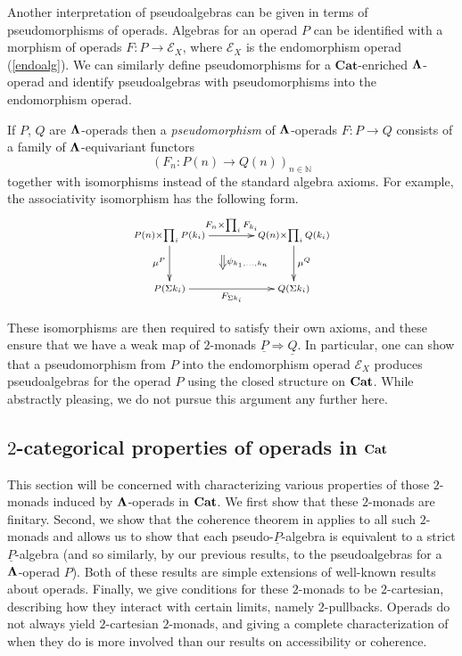\begin{rem}
Another interpretation of pseudoalgebras can be given in terms of pseudomorphisms of operads. Algebras for an operad $P$ can be identified with a morphism of operads $F \colon P \rightarrow \mathcal{E}_X$, where $\mathcal{E}_X$ is the endomorphism operad (\cref{endoalg}). We can similarly define pseudomorphisms for a $\mathbf{Cat}$-enriched $\mathbf{\Lambda}$-operad and identify pseudoalgebras with pseudomorphisms into the endomorphism operad.

If $P$, $Q$ are $\mathbf{\Lambda}$-operads then a \textit{pseudomorphism} of $\mathbf{\Lambda}$-operads $F \colon P \rightarrow Q$ consists of a family of $\mathbf{\Lambda}$-equivariant functors
            \[
                \left(F_n \colon P(n) \rightarrow Q(n)\right)_{n \in \mathbb{N}}
            \]
together with isomorphisms instead of the standard algebra axioms. For example, the associativity isomorphism has the following form.
            \[
                \xy
                    (0,0)*+{\scriptstyle P(n) \times \prod_i P(k_i)}="00";
                    (35,0)*+{\scriptstyle Q(n) \times \prod_i Q(k_i)}="10";
                    (0,-15)*+{\scriptstyle P(\Sigma k_i)}="01";
                    (35,-15)*+{\scriptstyle Q(\Sigma k_i)}="11";
                    {\ar^{F_n \times \prod_i F_{k_i}} "00" ; "10"};
                    {\ar^{\mu^Q} "10" ; "11"};
                    {\ar_{\mu^P} "00" ; "01"};
                    {\ar_{F_{\Sigma k_i}} "01" ; "11"};
                    {\ar@{=>}^{\psi_{k_1,\ldots,k_n}} (15,-5.5) ; (15,-9.5)};
                \endxy
            \]

These isomorphisms are then required to satisfy their own axioms, and these ensure that we have a weak map of $2$-monads $\underline{P} \Rightarrow \underline{Q}$. In particular, one can show that a pseudomorphism from $P$ into the endomorphism operad $\mathcal{E}_X$ produces pseudoalgebras for the operad $P$ using the closed structure on $\mathbf{Cat}$. While abstractly pleasing, we do not pursue this argument any further here.
\end{rem}

\subsection{$2$-categorical properties of operads in \texorpdfstring{$\mathbf{Cat}$}{\textbf{Cat}}}\label{sec:propofopsincat}

This section will be concerned with characterizing various properties of those $2$-monads induced by $\mathbf{\Lambda}$-operads in $\mathbf{Cat}$. We first show that these $2$-monads are finitary. Second, we show that the coherence theorem in \cite{lack-cod} applies to all such $2$-monads and allows us to show that each pseudo-$\underline{P}$-algebra is equivalent to a strict $\underline{P}$-algebra (and so similarly, by our previous results, to the pseudoalgebras for a $\mathbf{\Lambda}$-operad $P$). Both of these results are simple extensions of well-known results about operads. Finally, we give conditions for these $2$-monads to be $2$-cartesian, describing how they interact with certain limits, namely $2$-pullbacks. Operads do not always yield $2$-cartesian $2$-monads, and giving a complete characterization of when they do is more involved than our results on accessibility or coherence.


